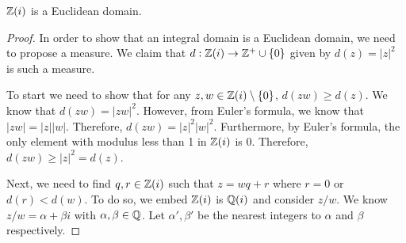 \documentclass[notitlepage]{simple}
\begin{document}
\begin{thm}
	$\mathbb{Z}(i)$ is a Euclidean domain.
\end{thm}
\begin{proof}
	In order to show that an integral domain is a Euclidean domain, we need to propose a measure.
	We claim that $d:\mathbb{Z}(i)\rightarrow\mathbb{Z}^{+}\cup\lbrace 0 \rbrace$ given by $d(z)=|z|^2$ is such a measure.

	To start we need to show that for any $z,w\in\mathbb{Z}(i)\setminus\lbrace 0 \rbrace$, $d(zw)\geq d(z)$.
	We know that $d(zw)=|zw|^2$.
	However, from Euler's formula, we know that $|zw|=|z||w|$.
	Therefore, $d(zw)=|z|^2|w|^2$.
	Furthermore, by Euler's formula, the only element with modulus less than 1 in $\mathbb{Z}(i)$ is 0.
	Therefore, $d(zw)\geq |z|^2=d(z)$.

	Next, we need to find $q,r\in\mathbb{Z}(i)$ such that $z=wq+r$ where $r=0$ or $d(r) < d(w)$.
	To do so, we embed $\mathbb{Z}(i)$ is $\mathbb{Q}(i)$ and consider $z/w$.
	We know $z/w=\alpha+\beta i$ with $\alpha,\beta\in\mathbb{Q}$.
	Let $\alpha',\beta'$ be the nearest integers to $\alpha$ and $\beta$ respectively.
\end{proof}
\end{document}
